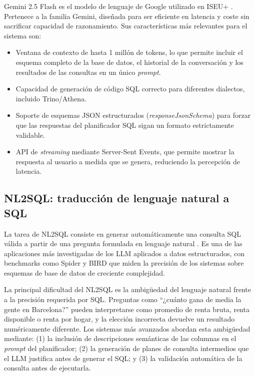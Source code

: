 Gemini 2.5 Flash es el modelo de lenguaje de Google utilizado en ISEU+ \parencite{Google2024Gemini}. Pertenece a la familia Gemini, diseñada para ser eficiente en latencia y coste sin sacrificar capacidad de razonamiento. Sus características más relevantes para el sistema son:

\begin{itemize}
  \item Ventana de contexto de hasta 1 millón de tokens, lo que permite incluir el esquema completo de la base de datos, el historial de la conversación y los resultados de las consultas en un único \textit{prompt}.
  \item Capacidad de generación de código SQL correcto para diferentes dialectos, incluido Trino/Athena.
  \item Soporte de esquemas JSON estructurados (\textit{responseJsonSchema}) para forzar que las respuestas del planificador SQL sigan un formato estrictamente validable.
  \item API de \textit{streaming} mediante Server-Sent Events, que permite mostrar la respuesta al usuario a medida que se genera, reduciendo la percepción de latencia.
\end{itemize}

\subsection{NL2SQL: traducción de lenguaje natural a SQL}

La tarea de NL2SQL consiste en generar automáticamente una consulta SQL válida a partir de una pregunta formulada en lenguaje natural \parencite{Guo2019Towards}. Es una de las aplicaciones más investigadas de los LLM aplicados a datos estructurados, con benchmarks como Spider \parencite{Yu2018Spider} y BIRD \parencite{Li2023BIRD} que miden la precisión de los sistemas sobre esquemas de base de datos de creciente complejidad.

La principal dificultad del NL2SQL es la ambigüedad del lenguaje natural frente a la precisión requerida por SQL. Preguntas como ``¿cuánto gana de media la gente en Barcelona?'' pueden interpretarse como promedio de renta bruta, renta disponible o renta por hogar, y la elección incorrecta devuelve un resultado numéricamente diferente. Los sistemas más avanzados abordan esta ambigüedad mediante: (1) la inclusión de descripciones semánticas de las columnas en el \textit{prompt} del planificador; (2) la generación de planes de consulta intermedios que el LLM justifica antes de generar el SQL; y (3) la validación automática de la consulta antes de ejecutarla.

